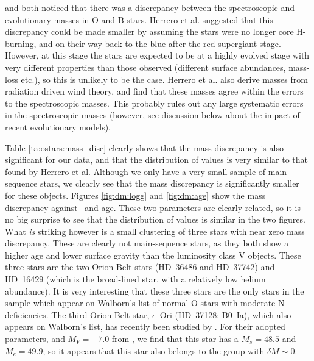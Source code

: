  and  both noticed that there was a discrepancy
between the spectroscopic and evolutionary masses in O and B
stars. Herrero et al. suggested that this discrepancy could be made
smaller by assuming the stars were no longer core H-burning, and on
their way back to the blue after the red supergiant stage. However, at
this stage the stars are expected to be at a highly evolved stage with
very different properties than those observed (different surface
abundances, mass-loss etc.), so this is unlikely to be the case. Herrero
et al. also derive masses from radiation driven wind theory, and
find that these masses agree within the errors to the spectroscopic
masses. This probably rules out any large systematic errors in the
spectroscopic masses (however, see discussion below about the impact
of recent evolutionary models).

Table \ref{ta:ostars:mass_disc} clearly shows that the mass
discrepancy is also significant for our data, and that the
distribution of values is very similar to that found by Herrero et
al. Although we only have a very small sample of main-sequence stars,
we clearly see that the mass discrepancy is significantly smaller for
these objects. Figures \ref{fig:dm:logg} and \ref{fig:dm:age} show the
mass discrepancy against \logg\ and age. These two parameters are
clearly related, so it is no big surprise to see that the distribution
of values is similar in the two figures. What \emph{is} striking
however is a small clustering of three stars with near zero mass
discrepancy. These are clearly not main-sequence stars, as they both
show a higher age and lower surface gravity than the luminosity class
V objects. These three stars are the two Orion Belt stars (HD~36486
and HD~37742) and HD~16429 (which is the broad-lined star, with a
relatively low helium abundance). It is very interesting that these
three stars are the only stars in the sample which appear on Walborn's
list of normal O stars with moderate N deficiencies. The third Orion
Belt star, $\epsilon$~Ori (HD~37128; B0~Ia), which also appears on
Walborn's list, has recently been studied by \cite{mcer:98}. For their
adopted parameters, and $M_V = -7.0$ from , we find that
this star has a $M_s = 48.5$ and $M_e = 49.9$; so it appears that this
star also belongs to the group with $\delta M \sim 0$.

